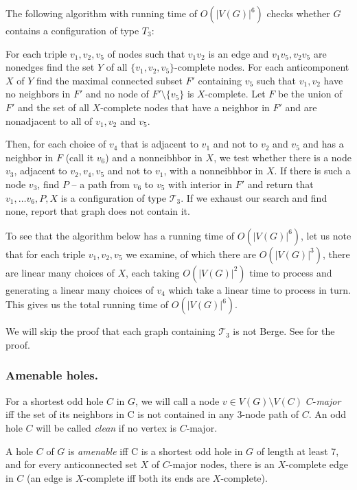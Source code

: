 \documentclass{article}
\newcommand{\TODO}{\todo[inline]}
\newcommand\T{\mathcal{T}}
\begin{document}
\TODO{image?}

The following algorithm with running time of $O(|V(G)|^6)$ checks whether $G$ contains a configuration of type $T_3$:

For each triple $v_1, v_2, v_5$ of nodes such that $v_1v_2$ is an edge and $v_1v_5, v_2v_5$ are nonedges find the set $Y$ of all $\{v_1, v_2, v_5\}$-complete nodes. For each anticomponent $X$ of $Y$ find the maximal connected subset $F'$ containing $v_5$ such that $v_1, v_2$ have no neighbors in $F'$ and no node of $F'\setminus\{v_5\}$ is $X$-complete. Let $F$ be the union of $F'$ and the set of all $X$-complete nodes that have a neighbor in $F'$ and are nonadjacent to all of $v_1, v_2$ and $v_5$. 

Then, for each choice of $v_4$ that is adjacent to $v_1$ and not to $v_2$ and $v_5$ and has a neighbor in $F$ (call it $v_6$) and a nonneibhbor in $X$, we test whether there is a node $v_3$, adjacent to $v_2, v_4, v_5$ and not to $v_1$, with a nonneibhbor in $X$. If there is such a node $v_3$, find $P$ -- a path from $v_6$ to $v_5$ with interior in $F'$ and return that $v_1, \ldots v_6, P, X$ is a configuration of type $\T_3$. If we exhaust our search and find none, report that graph does not contain it.

To see that the algorithm below has a running time of $O(|V(G)|^6)$, let us note that for each triple $v_1, v_2, v_5$ we examine, of which there are $O(|V(G)|^3)$, there are linear many choices of $X$, each taking $O(|V(G)|^2)$ time to process and generating a linear many choices of $v_4$ which take a linear time to process in turn. This gives us the total running time of $O(|V(G)|^6)$.

We will skip the proof that each graph containing $\T_3$ is not Berge.  See \cite{MC05} for the proof.

\subsubsection{Amenable holes.}

For a shortest odd hole $C$ in $G$, we will call a node $v \in V(G) \setminus V(C)$ $C$-\emph{major} iff the set of its neighbors in C is not contained in any 3-node path of $C$. An odd hole $C$ will be called \emph{clean} if no vertex is $C$-major.

A hole $C$ of $G$ is \emph{amenable} iff C is a shortest odd hole in $G$ of length at least 7, and for every anticonnected set $X$ of $C$-major nodes, there is an $X$-complete edge in $C$ (an edge is $X$-complete iff both its ends are $X$-complete).
\end{document}
